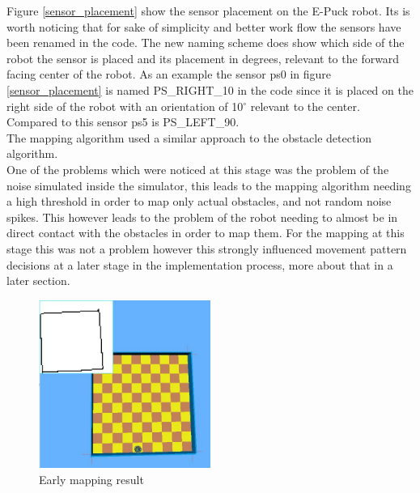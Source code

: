 Figure  \ref{sensor_placement} show the sensor placement on the E-Puck robot. Its is worth noticing that for sake of simplicity and better work flow the sensors have been renamed in the code. The new naming scheme does show which side of the robot the sensor is placed and its placement in degrees, relevant to the forward facing center of the robot. As an example the sensor ps0 in figure \ref{sensor_placement} is named PS\_RIGHT\_10 in the code since it is placed on the right side of the robot with an orientation of 10$^{\circ}$ relevant to the center.
Compared to this sensor ps5 is PS\_LEFT\_90.   \\[3ex]

The mapping algorithm used a similar approach to the obstacle detection algorithm. \\
One of the problems which were noticed at this stage was the problem of the noise simulated inside the simulator, this leads to the mapping algorithm needing a high threshold in order to map only actual obstacles, and not random noise spikes.  This however leads to the problem of the robot needing to almost be in direct contact with the obstacles in order to map them. For the mapping at this stage this was not a problem however this strongly influenced movement pattern decisions at a later stage in the implementation process, more about that in a later section.

\begin{figure}[h]
\centering
\includegraphics[width = 0.5\textwidth]{../../figures/early_map.jpg}
\caption{Early mapping result}
\label{early_mapping_result}
\end{figure}

